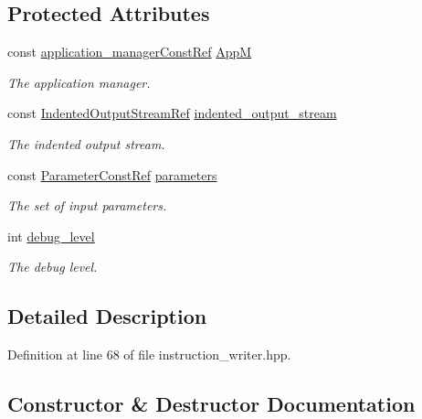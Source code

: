 \subsection*{Protected Attributes}
\begin{DoxyCompactItemize}
\item 
const \hyperlink{application__manager_8hpp_abb985163a2a3fb747f6f03b1eaadbb44}{application\+\_\+manager\+Const\+Ref} \hyperlink{classInstructionWriter_adc648b325e6ccab17a41fb16f503ca92}{AppM}
\begin{DoxyCompactList}\small\item\em The application manager. \end{DoxyCompactList}\item 
const \hyperlink{indented__output__stream_8hpp_ab32278e11151ef292759c88e99b77feb}{Indented\+Output\+Stream\+Ref} \hyperlink{classInstructionWriter_a8d06403d2bdb8f66559e2d4c2f1f1b48}{indented\+\_\+output\+\_\+stream}
\begin{DoxyCompactList}\small\item\em The indented output stream. \end{DoxyCompactList}\item 
const \hyperlink{Parameter_8hpp_a37841774a6fcb479b597fdf8955eb4ea}{Parameter\+Const\+Ref} \hyperlink{classInstructionWriter_a331d7d35c5526ead7951c74f4ecbe667}{parameters}
\begin{DoxyCompactList}\small\item\em The set of input parameters. \end{DoxyCompactList}\item 
int \hyperlink{classInstructionWriter_afaf09851e265153f4b2d40a71460177f}{debug\+\_\+level}
\begin{DoxyCompactList}\small\item\em The debug level. \end{DoxyCompactList}\end{DoxyCompactItemize}


\subsection{Detailed Description}


Definition at line 68 of file instruction\+\_\+writer.\+hpp.



\subsection{Constructor \& Destructor Documentation}
\mbox{\label{classInstructionWriter_ada26768a0d9c74b21b275f11fe4985e7}} 
